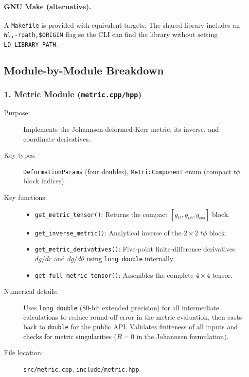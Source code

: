 \documentclass[11pt,twoside]{article}
\begin{document}
\paragraph{GNU Make (alternative).}
A \texttt{Makefile} is provided with equivalent targets. The shared library
includes an \texttt{-Wl,-rpath,\$ORIGIN} flag so the CLI can find the library
without setting \texttt{LD\_LIBRARY\_PATH}.

\subsection{Module-by-Module Breakdown}

\subsubsection{1. Metric Module (\texttt{metric.cpp/hpp})}

\begin{description}
\item[Purpose:] Implements the Johannsen deformed-Kerr metric, its inverse, and
coordinate derivatives.
\item[Key types:] \texttt{DeformationParams} (four doubles),
\texttt{MetricComponent} enum (compact $t\phi$ block indices).
\item[Key functions:]
\begin{itemize}
\item \texttt{get\_metric\_tensor()}: Returns the compact $[g_{tt}, g_{t\phi}, g_{\phi\phi}]$ block.
\item \texttt{get\_inverse\_metric()}: Analytical inverse of the $2\times2$ $t\phi$ block.
\item \texttt{get\_metric\_derivatives()}: Five-point finite-difference derivatives
$dg/dr$ and $dg/d\theta$ using \texttt{long double} internally.
\item \texttt{get\_full\_metric\_tensor()}: Assembles the complete $4\times4$ tensor.
\end{itemize}
\item[Numerical details:] Uses \texttt{long double} (80-bit extended precision) for
all intermediate calculations to reduce round-off error in the metric evaluation,
then casts back to \texttt{double} for the public API. Validates finiteness of all
inputs and checks for metric singularities ($B = 0$ in the Johannsen formulation).
\item[File location:] \texttt{src/metric.cpp}, \texttt{include/metric.hpp}.
\end{description}
\end{document}
